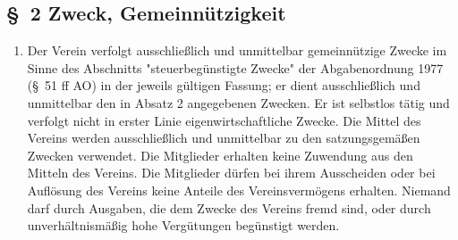 \documentclass[10pt,a4paper]{scrartcl}
\newcommand{\qs}[1]{"#1"}
\begin{document}
\subsection*{\S \ 2 Zweck, Gemeinn{\"u}tzigkeit}
\begin{enumerate}
\item Der Verein verfolgt ausschlie{\ss}lich und unmittelbar gemeinn{\"u}tzige
Zwecke im Sinne des Abschnitts \qs{steuerbeg{\"u}nstigte Zwecke} der
Abgabenordnung 1977 (\S \ 51 ff AO) in der jeweils g{\"u}ltigen Fassung;
er dient ausschlie{\ss}lich und unmittelbar den in Absatz 2 angegebenen
Zwecken. Er ist selbstlos t{\"a}tig und verfolgt nicht in erster Linie eigenwirtschaftliche Zwecke.
Die Mittel des Vereins werden ausschlie{\ss}lich und unmittelbar zu den
satzungsgem{\"a}{\ss}en Zwecken verwendet. Die Mitglieder erhalten keine
Zuwendung aus den Mitteln des Vereins. Die Mitglieder d{\"u}rfen bei
ihrem Ausscheiden oder bei Aufl{\"o}sung des Vereins keine Anteile des
Vereinsverm{\"o}gens erhalten. Niemand darf durch Ausgaben, die dem
Zwecke des Vereins fremd sind, oder durch unverh{\"a}ltnism{\"a}{\ss}ig hohe
Ver\-g{\"u}\-tung\-en be\-g{\"u}ns\-tigt werden.


\end{enumerate}
\end{document}
